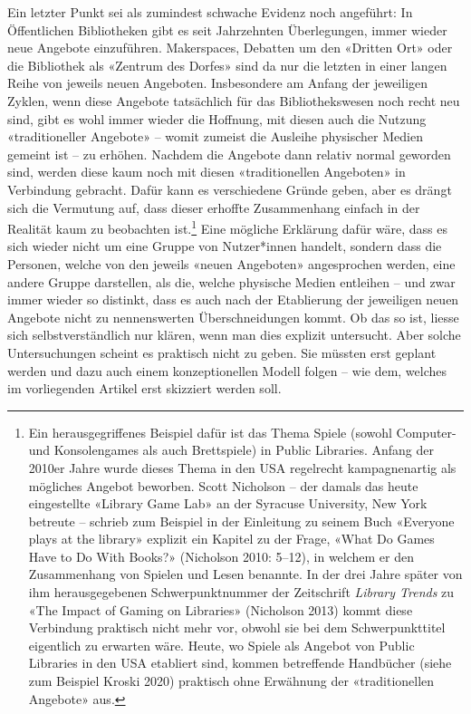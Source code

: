 \documentclass[a4paper,
fontsize=11pt,
oneside,
numbers=noperiodatend,
parskip=half-,
bibliography=totoc,
final
]{scrartcl}
\begin{document}
Ein letzter Punkt sei als zumindest schwache Evidenz noch angeführt: In
Öffentlichen Bibliotheken gibt es seit Jahrzehnten Überlegungen, immer
wieder neue Angebote einzuführen. Makerspaces, Debatten um den «Dritten
Ort» oder die Bibliothek als «Zentrum des Dorfes» sind da nur die
letzten in einer langen Reihe von jeweils neuen Angeboten. Insbesondere
am Anfang der jeweiligen Zyklen, wenn diese Angebote tatsächlich für das
Bibliothekswesen noch recht neu sind, gibt es wohl immer wieder die
Hoffnung, mit diesen auch die Nutzung «traditioneller Angebote» -- womit
zumeist die Ausleihe physischer Medien gemeint ist -- zu erhöhen.
Nachdem die Angebote dann relativ normal geworden sind, werden diese
kaum noch mit diesen «traditionellen Angeboten» in Verbindung gebracht.
Dafür kann es verschiedene Gründe geben, aber es drängt sich die
Vermutung auf, dass dieser erhoffte Zusammenhang einfach in der Realität
kaum zu beobachten ist.\footnote{Ein herausgegriffenes Beispiel dafür
  ist das Thema Spiele (sowohl Computer- und Konsolengames als auch
  Brettspiele) in Public Libraries. Anfang der 2010er Jahre wurde dieses
  Thema in den USA regelrecht kampagnenartig als mögliches Angebot
  beworben. Scott Nicholson -- der damals das heute eingestellte
  «Library Game Lab» an der Syracuse University, New York betreute --
  schrieb zum Beispiel in der Einleitung zu seinem Buch «Everyone plays
  at the library» explizit ein Kapitel zu der Frage, «What Do Games Have
  to Do With Books?» (Nicholson 2010: 5--12), in welchem er den
  Zusammenhang von Spielen und Lesen benannte. In der drei Jahre später
  von ihm herausgegebenen Schwerpunktnummer der Zeitschrift
  \emph{Library Trends} zu «The Impact of Gaming on Libraries»
  (Nicholson 2013) kommt diese Verbindung praktisch nicht mehr vor,
  obwohl sie bei dem Schwerpunkttitel eigentlich zu erwarten wäre.
  Heute, wo Spiele als Angebot von Public Libraries in den USA etabliert
  sind, kommen betreffende Handbücher (siehe zum Beispiel Kroski 2020)
  praktisch ohne Erwähnung der «traditionellen Angebote» aus.} Eine
mögliche Erklärung dafür wäre, dass es sich wieder nicht um eine Gruppe
von Nutzer*innen handelt, sondern dass die Personen, welche von den
jeweils «neuen Angeboten» angesprochen werden, eine andere Gruppe
darstellen, als die, welche physische Medien entleihen -- und zwar immer
wieder so distinkt, dass es auch nach der Etablierung der jeweiligen
neuen Angebote nicht zu nennenswerten Überschneidungen kommt. Ob das so
ist, liesse sich selbstverständlich nur klären, wenn man dies explizit
untersucht. Aber solche Untersuchungen scheint es praktisch nicht zu
geben. Sie müssten erst geplant werden und dazu auch einem
konzeptionellen Modell folgen -- wie dem, welches im vorliegenden
Artikel erst skizziert werden soll.
\end{document}

